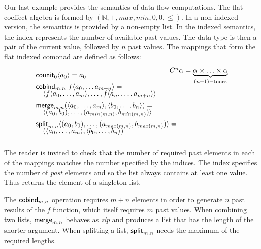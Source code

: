 \begin{example}
\label{thm:semantics-indexed-list}

Our last example provides the semantics of data-flow computations. The flat coeffect algebra
is formed by $(\mathbb{N}, +, \mathit{max}, \mathit{min}, 0, 0, \leq)$. In a
non-indexed version, the semantics is provided by a non-empty list. In the indexed semantics,
the index represents the number of available past values. The data type is then a pair of
the current value, followed by $n$ past values. The mappings that form the flat indexed comonad
are defined as follows:
%
\begin{equation*}
\begin{array}{l}
\ident{counit}_{0}\langle a_0 \rangle = a_0
\\[0.45em]
\ident{cobind}_{m, n}~f \langle a_0, \ldots a_{m+n} \rangle = \\[-0.25em]
\quad \langle f \langle a_0, \ldots, a_m \rangle, \ldots, f \langle a_{n}, \ldots, a_{m+n} \rangle \rangle
\\[0.45em]
\ident{merge}_{m, n} (\langle a_0, \ldots, a_m \rangle, \langle b_0, \ldots, b_n\rangle) = \\[-0.25em]
\quad \langle (a_0, b_0), \ldots, (a_{\mathit{min}(m,n)}, b_{\mathit{min}(m,n)}) \rangle
\\[0.45em]
\ident{split}_{m, n} \langle (a_0, b_0), \ldots, (a_{\mathit{max}(m,n)}, b_{\mathit{max}(m,n)}) \rangle = \\[-0.25em]
\quad (\langle a_0, \ldots, a_m \rangle, \langle b_0, \ldots, b_n\rangle)
\end{array}
\begin{array}{l}
\hspace{-2em}\ctyp{n}{\alpha} = \underbrace{\alpha \times \ldots \times \alpha}_{(n+1)-\textnormal{times}}\\[8em]
~\\
\end{array}
\end{equation*}
\end{example}

\noindent
The reader is invited to check that the number of required past elements in each of the mappings
matches the number specified by the indices. The index specifies the number of \emph{past} elements
and so the list always contains at least one value. Thus  returns the element of a
singleton list.

The $\textnormal{\sffamily cobind}_{m,n}$ operation requires $m + n$ elements in order to generate $n$ past results
of the $f$ function, which itself requires $m$ past values. When combining two lists,
$\textnormal{\sffamily merge}_{m,n}$ behaves as \emph{zip} and produces a list that has the length of the shorter
argument. When splitting a list, $\textnormal{\sffamily split}_{m, n}$ needs the maximum of the required lengths.


